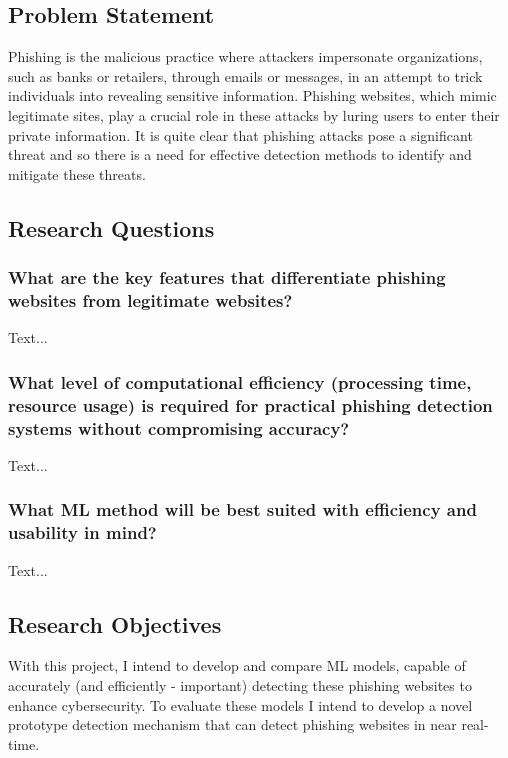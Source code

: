 \documentclass{sigkddExp}
\begin{document}
\subsection{Problem Statement}
\label{prob_statement}
Phishing is the malicious practice where attackers impersonate organizations, such as banks or retailers, through emails or messages, in an attempt to trick individuals into revealing sensitive information. Phishing websites, which mimic legitimate sites, play a crucial role in these attacks by luring users to enter their private information. It is quite clear that phishing attacks pose a significant threat and so there is a need for effective detection methods to identify and mitigate these threats. 

\subsection{Research Questions}

\subsubsection{What are the key features that differentiate phishing websites from legitimate websites?}
\label{rq_1}
Text...
\subsubsection{What level of computational efficiency (processing time, resource usage) is required for practical phishing detection systems without compromising accuracy?}
\label{rq_2}
Text...
\subsubsection{What ML method will be best suited with efficiency and usability in mind?}
\label{rq_3}
Text...
\subsection{Research Objectives}
\label{research_objs}
With this project, I intend to develop and compare ML models, capable of accurately (and efficiently - important) detecting these phishing websites to enhance cybersecurity. To evaluate these models I intend to develop a novel prototype detection mechanism that can detect phishing websites in near real-time.
\iffalse
\subsection{Aims and Limitations}
\label{aims_and_lims}
The scope of this
\fi
\end{document}
